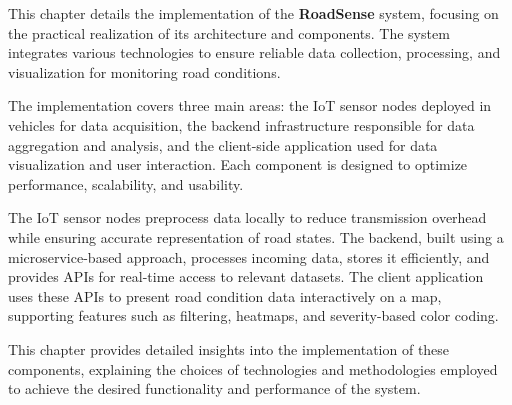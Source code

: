 This chapter details the implementation of the \textbf{RoadSense} system, focusing on the practical realization of its architecture and components. The system integrates various technologies to ensure reliable data collection, processing, and visualization for monitoring road conditions.

The implementation covers three main areas: the IoT sensor nodes deployed in vehicles for data acquisition, the backend infrastructure responsible for data aggregation and analysis, and the client-side application used for data visualization and user interaction. Each component is designed to optimize performance, scalability, and usability.

The IoT sensor nodes preprocess data locally to reduce transmission overhead while ensuring accurate representation of road states. The backend, built using a microservice-based approach, processes incoming data, stores it efficiently, and provides APIs for real-time access to relevant datasets. The client application uses these APIs to present road condition data interactively on a map, supporting features such as filtering, heatmaps, and severity-based color coding.

This chapter provides detailed insights into the implementation of these components, explaining the choices of technologies and methodologies employed to achieve the desired functionality and performance of the system.

\pagebreak
